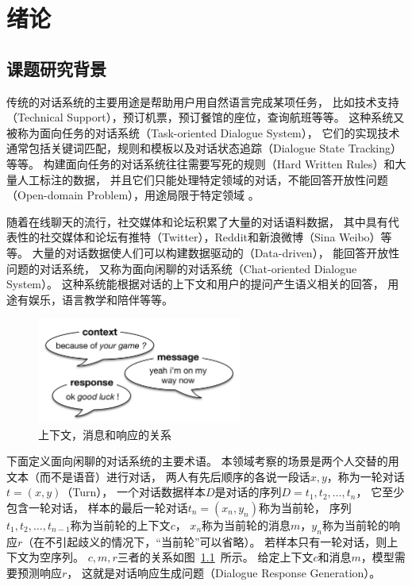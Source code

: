 \chapter{绪论}\label{ch:introduction}

\section{课题研究背景}\label{sec:research_background}
传统的对话系统的主要用途是帮助用户用自然语言完成某项任务，
比如技术支持（Technical Support），预订机票，预订餐馆的座位，查询航班等等。
这种系统又被称为面向任务的对话系统（Task-oriented Dialogue System），
它们的实现技术通常包括关键词匹配，规则和模板以及对话状态追踪（Dialogue State Tracking）等等。
构建面向任务的对话系统往往需要写死的规则（Hard Written Rules）和大量人工标注的数据，
并且它们只能处理特定领域的对话，不能回答开放性问题（Open-domain Problem），用途局限于特定领域
。

随着在线聊天的流行，社交媒体和论坛积累了大量的对话语料数据，
其中具有代表性的社交媒体和论坛有推特（Twitter），Reddit和新浪微博（Sina Weibo）等等。
大量的对话数据使人们可以构建数据驱动的（Data-driven），
能回答开放性问题的对话系统，
又称为面向闲聊的对话系统（Chat-oriented Dialogue System）。
这种系统能根据对话的上下文和用户的提问产生语义相关的回答，
用途有娱乐，语言教学和陪伴等等。
\begin{figure}[H]
    \includegraphics[width=0.6\textwidth]{figure/context_message_response.png}
    \centering
    \caption{上下文，消息和响应的关系}
    \label{fig:context_message_response}
\end{figure}

下面定义面向闲聊的对话系统的主要术语。
本领域考察的场景是两个人交替的用文本（而不是语音）进行对话，
两人有先后顺序的各说一段话$x, y$，称为一轮对话$t = (x, y)$（Turn），
一个对话数据样本$D$是对话的序列$D = t_1, t_2, \dots, t_n$，
它至少包含一轮对话，
样本的最后一轮对话$t_n = (x_n, y_n)$称为当前轮，
序列$t_1, t_2, \dots, t_{n-1}$称为当前轮的上下文$c$，
$x_n$称为当前轮的消息$m$，$y_n$称为当前轮的响应$r$（在不引起歧义的情况下，“当前轮”可以省略）。
若样本只有一轮对话，则上下文为空序列。
$c,m,r$三者的关系如图~\ref{fig:context_message_response}~所示。
给定上下文$c$和消息$m$，模型需要预测响应$r$，
这就是对话响应生成问题（Dialogue Response Generation）。


